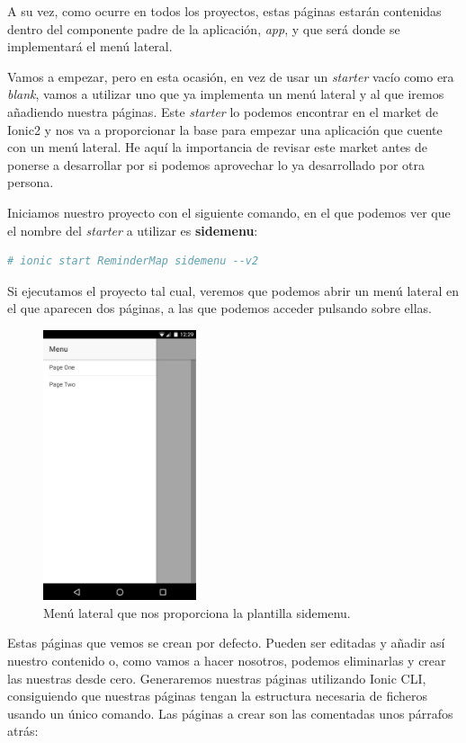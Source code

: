 A su vez, como ocurre en todos los proyectos, estas páginas estarán contenidas dentro del componente padre de la aplicación, \emph{app}, y que será donde se implementará el menú lateral.

Vamos a empezar, pero en esta ocasión, en vez de usar un \emph{starter} vacío como era \emph{blank}, vamos a utilizar uno que ya implementa un menú lateral y al que iremos añadiendo nuestra páginas. Este \emph{starter} lo podemos encontrar en el market de Ionic2 y nos va a proporcionar la base para empezar una aplicación que cuente con un menú lateral. He aquí la importancia de revisar este market antes de ponerse a desarrollar por si podemos aprovechar lo ya desarrollado por otra persona.

Iniciamos nuestro proyecto con el siguiente comando, en el que podemos ver que el nombre del \emph{starter} a utilizar es \textbf{sidemenu}:

\begin{lstlisting}[language=bash]
  # ionic start ReminderMap sidemenu --v2
\end{lstlisting}

Si ejecutamos el proyecto tal cual, veremos que podemos abrir un menú lateral en el que aparecen dos páginas, a las que podemos acceder pulsando sobre ellas.

\begin{figure}[H]
\centering
    \centering
        \includegraphics[width=0.4\textwidth]{Figures/ch2/ReminderMap/sidemenu_starter_serve}
    \caption{Menú lateral que nos proporciona la plantilla sidemenu.}
\end{figure}

Estas páginas que vemos se crean por defecto. Pueden ser editadas y añadir así nuestro contenido o, como vamos a hacer nosotros, podemos eliminarlas y crear las nuestras desde cero. Generaremos nuestras páginas utilizando Ionic CLI, consiguiendo que nuestras páginas tengan la estructura necesaria de ficheros usando un único comando. Las páginas a crear son las comentadas unos párrafos atrás:

